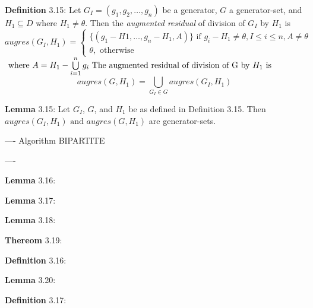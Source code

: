 \documentclass{article}
\begin{document}
\par 
\textbf{Definition} 3.15: Let $G_I = ( g_1, g_2, \ldots, g_n)$ be a
generator, $G$ a generator-set, and $H_1 \subseteq D$ where $H_1 \neq \theta$.
Then the \textit{augmented residual} of division of $G_I$ by $H_1$ is
\[
augres(G_I, H_1) = 
\begin{cases}
 \{ (g_1 - H1, \ldots, g_n - H_1, A) \} \text{ if } g_i - H_1 \neq \theta, I
 \leq i \leq n, A \neq \theta
 \\
 \theta, \text{ otherwise}
\end{cases}
\]
\newline
$\text{ where } A = H_1 - \bigcup\limits_{i=1}^{n} g_i
\newline
\text{ The augmented residual of division of G by } H_1 \text{ is }$
\[
augres(G, H_1) = \bigcup\limits_{G_I \in G}augres(G_I, H_1)
\]
\newline

\par 
\textbf{Lemma} 3.15: Let $G_I$, $G$, and $H_1$ be as defined in Definition 3.15.
Then $augres( G_I, H_1) \text{ and } augres(G, H_1)$ are generator-sets.
\newline

----
\newline
Algorithm BIPARTITE
\newline



----

\par 
\textbf{Lemma} 3.16:
\newline

\par 
\textbf{Lemma} 3.17:
\newline

\par 
\textbf{Lemma} 3.18:
\newline

\par 
\textbf{Thereom} 3.19:
\newline


\par 
\textbf{Definition} 3.16:
\newline

\par 
\textbf{Lemma} 3.20:
\newline

\par 
\textbf{Definition} 3.17:
\newline
\end{document}
